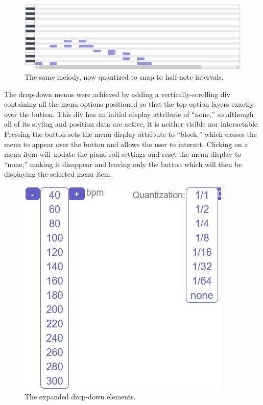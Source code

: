 \begin{figure}[h!]
  \centering
  \includegraphics[width=\linewidth]{image/TwinkleQuantized.png}
  \caption{The same melody, now quantized to snap to half-note intervals.}
  \label{fig:twinkle_quantized}
\end{figure}

The drop-down menus were achieved by adding a vertically-scrolling div containing all the menu
options positioned so that the top option layers exactly over the button. This div has an initial
display attribute of “none,” so although all of its styling and position data are active, it is
neither visible nor interactable. Pressing the button sets the menu display attribute to “block,”
which causes the menu to appear over the button and allows the user to interact. Clicking on a menu
item will update the piano roll settings and reset the menu display to “none,” making it disappear
and leaving only the button which will then be displaying the selected menu item.

\begin{figure}[h!]
  \centering
  \includegraphics[width=0.4\linewidth]{image/Dropdowns.png}
  \caption{The expanded drop-down elements.}
  \label{fig:dropdowns}
\end{figure}

